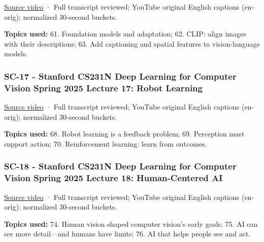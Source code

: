 \hypertarget{04-visual-computing-ii-ch036-sc-16---stanford-cs231n-deep-learning-for-computer-vision-spring-2025-lecture-16-vision-and-language}{}

\href{https://www.youtube.com/watch?v=mQOK0Mfyrkk}{Source video} · Full transcript reviewed; YouTube original English captions (en-orig); normalized 30-second buckets.

\textbf{Topics used:} 61. Foundation models and adaptation; 62. CLIP: align images with their descriptions; 63. Add captioning and spatial features to vision-language models.

\subsubsection{SC-17 - Stanford CS231N Deep Learning for Computer Vision Spring 2025 Lecture 17: Robot Learning}\label{04-visual-computing-ii-ch036-sc-17---stanford-cs231n-deep-learning-for-computer-vision-spring-2025-lecture-17-robot-learning}

\hypertarget{04-visual-computing-ii-ch036-sc-17---stanford-cs231n-deep-learning-for-computer-vision-spring-2025-lecture-17-robot-learning}{}

\href{https://www.youtube.com/watch?v=XSfmOH_xVSU}{Source video} · Full transcript reviewed; YouTube original English captions (en-orig); normalized 30-second buckets.

\textbf{Topics used:} 68. Robot learning is a feedback problem; 69. Perception must support action; 70. Reinforcement learning: learn from outcomes.

\subsubsection{SC-18 - Stanford CS231N Deep Learning for Computer Vision Spring 2025 Lecture 18: Human-Centered AI}\label{04-visual-computing-ii-ch036-sc-18---stanford-cs231n-deep-learning-for-computer-vision-spring-2025-lecture-18-human-centered-ai}

\hypertarget{04-visual-computing-ii-ch036-sc-18---stanford-cs231n-deep-learning-for-computer-vision-spring-2025-lecture-18-human-centered-ai}{}

\href{https://www.youtube.com/watch?v=g8UaBfj6Sh8}{Source video} · Full transcript reviewed; YouTube original English captions (en-orig); normalized 30-second buckets.

\textbf{Topics used:} 74. Human vision shaped computer vision's early goals; 75. AI can see more detail---and humans have limits; 76. AI that helps people see and act.

